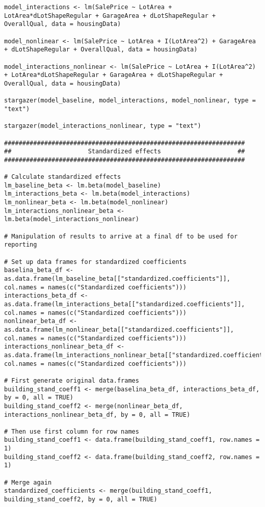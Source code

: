 \documentclass{article}
\begin{document}
\begin{tiny}
\begin{verbatim}
model_interactions <- lm(SalePrice ~ LotArea + LotArea*dLotShapeRegular + GarageArea + dLotShapeRegular + OverallQual, data = housingData)

model_nonlinear <- lm(SalePrice ~ LotArea + I(LotArea^2) + GarageArea + dLotShapeRegular + OverallQual, data = housingData)

model_interactions_nonlinear <- lm(SalePrice ~ LotArea + I(LotArea^2) + LotArea*dLotShapeRegular + GarageArea + dLotShapeRegular + OverallQual, data = housingData)

stargazer(model_baseline, model_interactions, model_nonlinear, type = "text")

stargazer(model_interactions_nonlinear, type = "text")

##################################################################
##                     Standardized effects                     ##
##################################################################

# Calculate standardized effects
lm_baseline_beta <- lm.beta(model_baseline)
lm_interactions_beta <- lm.beta(model_interactions)
lm_nonlinear_beta <- lm.beta(model_nonlinear)
lm_interactions_nonlinear_beta <- lm.beta(model_interactions_nonlinear)

# Manipulation of results to arrive at a final df to be used for reporting

# Set up data frames for standardized coefficients
baselina_beta_df <- as.data.frame(lm_baseline_beta[["standardized.coefficients"]], col.names = names(c("Standardized coefficients")))
interactions_beta_df <- as.data.frame(lm_interactions_beta[["standardized.coefficients"]], col.names = names(c("Standardized coefficients")))
nonlinear_beta_df <- as.data.frame(lm_nonlinear_beta[["standardized.coefficients"]], col.names = names(c("Standardized coefficients")))
interactions_nonlinear_beta_df <- as.data.frame(lm_interactions_nonlinear_beta[["standardized.coefficients"]], col.names = names(c("Standardized coefficients")))

# First generate original data.frames
building_stand_coeff1 <- merge(baselina_beta_df, interactions_beta_df, by = 0, all = TRUE)
building_stand_coeff2 <- merge(nonlinear_beta_df, interactions_nonlinear_beta_df, by = 0, all = TRUE)

# Then use first column for row names
building_stand_coeff1 <- data.frame(building_stand_coeff1, row.names = 1)
building_stand_coeff2 <- data.frame(building_stand_coeff2, row.names = 1)

# Merge again 
standardized_coefficients <- merge(building_stand_coeff1, building_stand_coeff2, by = 0, all = TRUE)


\end{verbatim}
\end{tiny}
\end{document}
